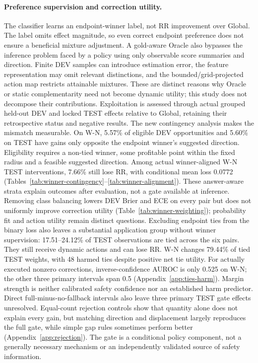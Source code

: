 \documentclass[11pt,a4paper]{article}
\begin{document}
\paragraph{Preference supervision and correction utility.}
The classifier learns an endpoint-winner label, not RR improvement over Global. The label omits effect magnitude, so even correct endpoint preference does not ensure a beneficial mixture adjustment. A gold-aware Oracle also bypasses the inference problem faced by a policy using only observable score summaries and direction. Finite DEV samples can introduce estimation error, the feature representation may omit relevant distinctions, and the bounded/grid-projected action map restricts attainable mixtures. These are distinct reasons why Oracle or static complementarity need not become dynamic utility; this study does not decompose their contributions. Exploitation is assessed through actual grouped held-out DEV and locked TEST effects relative to Global, retaining their retrospective status and negative results.
The new contingency analysis makes the mismatch measurable. On W-N, 5.57\% of eligible DEV opportunities and 5.60\% on TEST have gains only opposite the endpoint winner's suggested direction. Eligibility requires a non-tied winner, some profitable point within the fixed radius and a feasible suggested direction. Among actual winner-aligned W-N TEST interventions, 7.66\% still lose RR, with conditional mean loss 0.0772 (Tables~\ref{tab:winner-contingency}--\ref{tab:winner-alignment}). These answer-aware strata explain outcomes after evaluation, not a gate available at inference. Removing class balancing lowers DEV Brier and ECE on every pair but does not uniformly improve correction utility (Table~\ref{tab:winner-weighting}); probability fit and action utility remain distinct questions.
Excluding endpoint ties from the binary loss also leaves a substantial application group without winner supervision: 17.51--24.12\% of TEST observations are tied across the six pairs. They still receive dynamic actions and can lose RR. W-N changes 79.44\% of tied TEST weights, with 48 harmed ties despite positive net tie utility. For actually executed nonzero corrections, inverse-confidence AUROC is only 0.525 on W-N; the other three primary intervals span 0.5 (Appendix~\ref{app:ties-harm}). Margin strength is neither calibrated safety confidence nor an established harm predictor.
Direct full-minus-no-fallback intervals also leave three primary TEST gate effects unresolved. Equal-count rejection controls show that quantity alone does not explain every gain, but matching direction and displacement largely reproduces the full gate, while simple gap rules sometimes perform better (Appendix~\ref{app:rejection}). The gate is a conditional policy component, not a generally necessary mechanism or an independently validated source of safety information.
\end{document}
